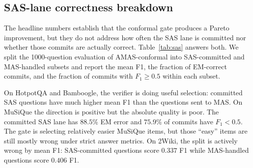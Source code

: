 \documentclass[11pt]{article}
\newcommand{\amas}{AMAS\xspace}
\newcommand{\sas}{SAS\xspace}
\newcommand{\mas}{MAS\xspace}
\begin{document}
\subsection{\sas-lane correctness breakdown}
\label{sec:sas-breakdown}

The headline numbers establish that the conformal gate produces a Pareto
improvement, but they do not address how often the \sas lane is committed
nor whether those commits are actually correct. Table~\ref{tab:sas} answers
both. We split the 1000-question evaluation of \amas-conformal into
\sas-committed and \mas-handled subsets and report the mean F1, the
fraction of EM-correct commits, and the fraction of commits with $F_1\geq
0.5$ within each subset.

\begin{table}[H]
\centering
\small
{}
\caption{\sas-vs-\mas distribution and \sas error rates for \amas-conformal.
``SAS EM err'' is the fraction of committed \sas answers that are not exact
matches. ``$F_1{<}0.5$'' is a softer committed-answer error rate.}
\label{tab:sas}
\end{table}

On HotpotQA and Bamboogle, the verifier is doing useful selection: committed
\sas questions have much higher mean F1 than the questions sent to \mas. On
MuSiQue the direction is positive but the absolute quality is poor. The
committed \sas lane has $88.5\%$ EM error and $75.9\%$ of commits have
$F_1<0.5$. The gate is selecting relatively easier MuSiQue items, but those
``easy'' items are still mostly wrong under strict answer metrics. On 2Wiki,
the split is actively wrong by mean F1: \sas-committed questions score
$0.337$ F1 while \mas-handled questions score $0.406$ F1.
\end{document}
